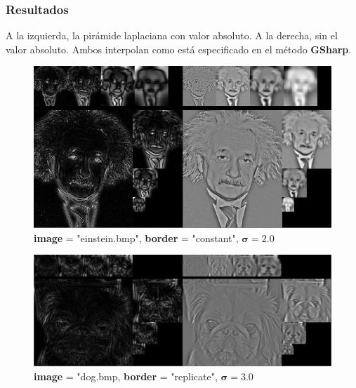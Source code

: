 \documentclass{article}
\begin{document}
\newpage

\subsubsection{Resultados}
A la izquierda, la pirámide laplaciana con valor absoluto. A la derecha, sin el valor absoluto. Ambos interpolan como está especificado en el método \textbf{GSharp}.
\begin{figure}[hbt!]
	\centering
	\includegraphics[width=1.\textwidth]{assets/ex1-A/lp-constant-s2.jpg}
	\caption{\textbf{image} = "einstein.bmp", \textbf{border} = "constant", $\boldsymbol{\sigma} = 2.0$}
\end{figure}
\begin{figure}[hbt!]
	\centering
	\includegraphics[width=1.\textwidth]{assets/ex1-A/lp-replicates-s3.jpg}
	\caption{\textbf{image} = "dog.bmp, \textbf{border} = "replicate", $\boldsymbol{\sigma} = 3.0$}
\end{figure}

\newpage
\end{document}

